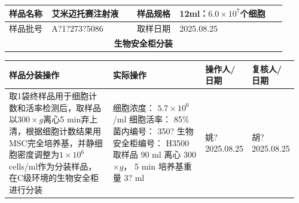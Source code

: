 \documentclass[UTF8,10pt,a4paper,fontset=fandol]{ctexart}
\newcommand{\fieldvalue}[1]{#1}
\newcommand{\handwritten}[1]{#1}
\begin{document}
\noindent
\begin{tabular}{|p{0.14\linewidth}|p{0.29\linewidth}|p{0.14\linewidth}|p{0.35\linewidth}|}
\hline
样品名称 &
\fieldvalue{艾米迈托赛注射液} &
样品规格 &
\fieldvalue{12ml：$6.0\times 10^{7}$个细胞}
\\ \hline
样品批号 &
\fieldvalue{\handwritten{A?1?273?5086}} &
取样日期 &
\fieldvalue{\handwritten{2025.08.25}}
\\ \hline
\multicolumn{4}{|c|}{\textbf{生物安全柜分装}}\\ \hline
\end{tabular}

\vspace{2mm}

\noindent
\begin{tabular}{|p{0.36\linewidth}|p{0.32\linewidth}|p{0.14\linewidth}|p{0.14\linewidth}|}
\hline
样品分装操作 & 实际操作 & 操作人/日期 & 复核人/日期\\ \hline
取1袋终样品用于细胞计数和活率检测后，取样品以$300\times g$离心5 min弃上清，根据细胞计数结果用MSC完全培养基，并静细胞密度调整为$1\times10^{6}$ cells/ml作为分装样品，在C级环境的生物安全柜进行分装
&
细胞浓度：
\fieldvalue{\handwritten{$5.7\times10^{6}$/ml}}\newline
细胞活率：
\fieldvalue{\handwritten{85\%}}\newline
菌内编号：
\fieldvalue{\handwritten{350?}}\newline
生物安全柜编号：
\fieldvalue{\handwritten{H3500}}\newline
取样品
\fieldvalue{\handwritten{90}} ml\newline
离心
\fieldvalue{\handwritten{300}}$\times g$，
\fieldvalue{\handwritten{5}} min\newline
培养基重量
\fieldvalue{\handwritten{3?}} ml
&
\fieldvalue{\handwritten{姚?}}\newline
\fieldvalue{\handwritten{2025.08.25}}
&
\fieldvalue{\handwritten{胡?}}\newline
\fieldvalue{\handwritten{2025.08.25}}
\\ \hline
\end{tabular}
\end{document}
